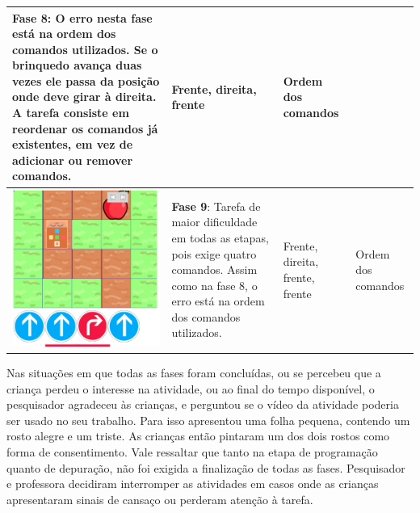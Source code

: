 \begin{quadro}[htbp]
\begin{longtable}{ | m{} | m{} | m{} | m{} |}
         \textbf{Fase 8}:
         O erro nesta fase está na ordem dos comandos utilizados. Se o brinquedo avança duas vezes ele passa da posição onde deve girar à direita. A tarefa consiste em reordenar os comandos já existentes, em vez de adicionar ou remover comandos. &
 
         Frente, direita, frente & Ordem dos comandos
         
         \\ \hline
     
     
         \includegraphics[width=.9\linewidth]{figs/debug/4.png} &
     
         \textbf{Fase 9}: 
         Tarefa de maior dificuldade em todas as etapas, pois exige quatro comandos. Assim como na fase 8, o erro está na ordem dos comandos utilizados.
         &
         Frente, direita, frente, frente & Ordem dos comandos
         
         \\ \hline
     

    \end{longtable}
\end{quadro}

Nas situações em que todas as fases foram concluídas, ou se percebeu que a criança perdeu o interesse na atividade, ou ao final do tempo disponível, o pesquisador agradeceu às crianças, e perguntou se o vídeo da atividade poderia ser usado no seu trabalho. Para isso apresentou uma folha pequena, contendo um rosto alegre e um triste. As crianças então pintaram um dos dois rostos como forma de consentimento. Vale ressaltar que tanto na etapa de programação quanto de depuração, não foi exigida a finalização de todas as fases. Pesquisador e professora decidiram interromper as atividades em casos onde as crianças apresentaram sinais de cansaço ou perderam atenção à tarefa.

